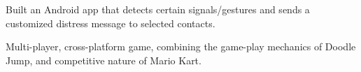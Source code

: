\documentclass[letterpaper]{deedy-resume} %
\begin{document}
\begin{minipage}[t]{0.66\textwidth}
Built an Android app that detects certain signals/gestures and sends a customized distress message to selected contacts.

\sectionspace %



Multi-player, cross-platform game, combining the game-play mechanics of Doodle Jump, and competitive nature of Mario Kart.

\sectionspace %

\end{minipage} %

\end{document}
